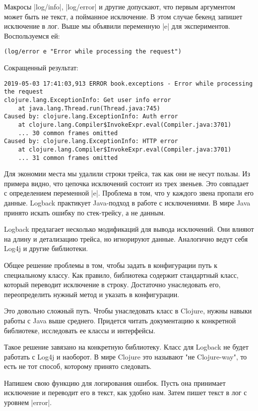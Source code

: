 Макросы \spverb|log/info|, \spverb|log/error| и другие допускают, что первым аргументом может
быть не текст, а пойманное исключение. В этом случае бекенд запишет исключение в
лог. Выше мы объявили переменную \spverb|e| для экспериментов. Воспользуемся ей:

\begin{verbatim}
(log/error e "Error while processing the request")
\end{verbatim}

Сокращенный результат:

\begin{verbatim}
2019-05-03 17:41:03,913 ERROR book.exceptions - Error while processing the request
clojure.lang.ExceptionInfo: Get user info error
	at java.lang.Thread.run(Thread.java:745)
Caused by: clojure.lang.ExceptionInfo: Auth error
	at clojure.lang.Compiler$InvokeExpr.eval(Compiler.java:3701)
	... 30 common frames omitted
Caused by: clojure.lang.ExceptionInfo: HTTP error
	at clojure.lang.Compiler$InvokeExpr.eval(Compiler.java:3701)
	... 31 common frames omitted
\end{verbatim}

Для экономии места мы удалили строки трейса, так как они не несут пользы. Из
примера видно, что цепочка исключений состоит из трех звеньев. Это совпадает с
определением переменной \spverb|e|. Проблема в том, что у каждого звена пропали его
данные. Logback практикует Java-подход в работе с исключениями. В мире Java
принято искать ошибку по стек-трейсу, а не данным.

Logback предлагает несколько модификаций для вывода исключений. Они влияют на
длину и детализацию трейса, но игнорируют данные. Аналогично ведут себя Log4j и
другие библиотеки.

Общее решение проблемы в том, чтобы задать в конфигурации путь к специальному
классу. Как правило, библиотека содержит стандартный класс, который переводит
исключение в строку. Достаточно унаследовать его, переопределить нужный метод и
указать в конфигурации.

Это довольно сложный путь. Чтобы унаследовать класс в Clojure, нужны навыки
работы с Java выше среднего. Придется читать документацию к конкретной
библиотеке, исследовать ее классы и интерфейсы.

Такое решение завязано на конкретную библиотеку. Класс для Logback не будет
работать с Log4j и наоборот. В мире Clojure это называют "не Clojure-way", то
есть не тот способ, которому принято следовать.

Напишем свою функцию для логирования ошибок. Пусть она принимает исключение и
переводит его в текст, как удобно нам. Затем пишет текст в лог с уровнем
\spverb|error|.

